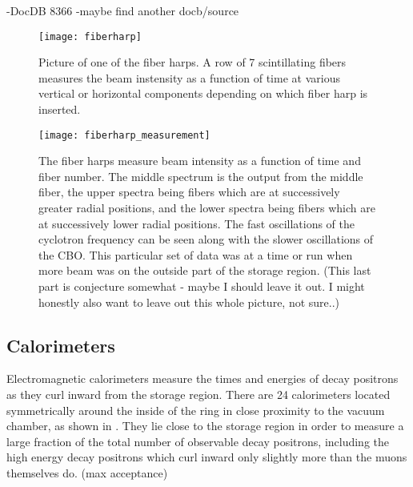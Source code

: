 -DocDB 8366
-maybe find another docb/source

\begin{figure}[]
    \centering
    \texttt{[image: fiberharp]}
    \caption[Fiber Harp]{Picture of one of the fiber harps. A row of 7 scintillating fibers measures the beam instensity as a function of time at various vertical or horizontal components depending on which fiber harp is inserted.}   
    \label{fig:fiberharp}
\end{figure}

\begin{figure}[]
    \centering
    \texttt{[image: fiberharp\_measurement]}
    \caption[Fiber Harp Measurement]{The fiber harps measure beam intensity as a function of time and fiber number. The middle spectrum is the output from the middle fiber, the upper spectra being fibers which are at successively greater radial positions, and the lower spectra being fibers which are at successively lower radial positions. The fast oscillations of the cyclotron frequency can be seen along with the slower oscillations of the CBO. This particular set of data was at a time or run when more beam was on the outside part of the storage region. (This last part is conjecture somewhat - maybe I should leave it out. I might honestly also want to leave out this whole picture, not sure..)}   
    \label{fig:fiberharp_measurement}
\end{figure}


\subsection{Calorimeters}
\label{sec:Calorimeters}


Electromagnetic calorimeters measure the times and energies of decay positrons as they curl inward from the storage region. There are 24 calorimeters located symmetrically around the inside of the ring in close proximity to the vacuum chamber, as shown in . They lie close to the storage region in order to measure a large fraction of the total number of observable decay positrons, including the high energy decay positrons which curl inward only slightly more than the muons themselves do. (max acceptance)

